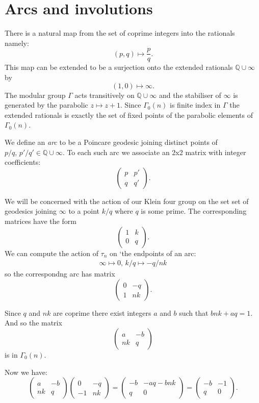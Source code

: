 \documentclass[12pt,a4paper]{amsart}
\def\QQ{\mathbb{Q}}
\begin{document}
\section{Arcs and involutions}\label{arcs and involutions}

There is  a natural map from the set of coprime integers into the rationals
namely: $$(p,q) \mapsto \frac{p}{q}.$$ This map can be extended to be a
surjection onto the extended rationals $\QQ \cup \infty$ by $$(1,0) \mapsto
\infty.$$ 
The modular group $\Gamma$ acts transitively on $\QQ \cup \infty$ and
the stabiliser of $\infty$ is generated by the parabolic $z\mapsto z+1$.
Since  $\Gamma_0(n)$ is finite index in $\Gamma$ the extended
rationals is exactly the set of fixed points of the parabolic elements of
$\Gamma_0(n)$.

We define an \textit{arc} to be a Poincare  geodesic joining  distinct points of $p/q ,\,  p'/q' \in \QQ \cup \infty$.	
To each such arc we associate 
an 2x2 matrix  with integer coefficients:
$$\begin{pmatrix} p & p' \\ q  & q' \end{pmatrix}.$$

We will be concerned with the action of our Klein four group on the set 
set of geodesics joining $\infty$ to a point $k/q$  where  $q$ is some prime.
The corresponding matrices have the form
$$\begin{pmatrix} 1 & k  \\ 0  & q \end{pmatrix}.$$
We can compute the action of $\tau_n$ on `the  endpoints of an  arc:
\begin{eqnarray*}
\infty  \mapsto 0, \, k/q \mapsto -q/nk
\end{eqnarray*}
so the correspondng arc has matrix
$$\begin{pmatrix} 0 & -q  \\ 1  & nk \end{pmatrix}.$$

Since $q$ and $nk$  are coprime there exist integers $a$ and $b$ such that
$bnk + aq = 1$.
And so the matrix
$$\begin{pmatrix} a & -b  \\ nk  & q \end{pmatrix}$$
is in $\Gamma_0(n)$.

Now we have:
$$\begin{pmatrix} a & -b  \\ nk  & q \end{pmatrix}
\begin{pmatrix} 0 & -q  \\ -1  & nk \end{pmatrix}
= \begin{pmatrix} -b & -aq -bnk  \\ q   & 0 \end{pmatrix}
= \begin{pmatrix} -b & -1 \\ q   & 0 \end{pmatrix}
.$$
\end{document}
